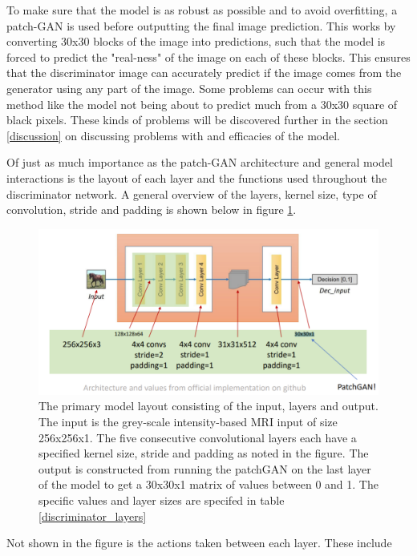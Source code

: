 \documentclass[12pt, fleqn, titlepage]{article}
\begin{document}
To make sure that the model is as robust as possible and to avoid overfitting, a patch-GAN is used before outputting the final image prediction. This works by converting 30x30 blocks of the image into predictions, such that the model is forced to predict the "real-ness" of the image on each of these blocks. This ensures that the discriminator image can accurately predict if the image comes from the generator using any part of the image. Some problems can occur with this method like the model not being about to predict much from a 30x30 square of black pixels. These kinds of problems will be discovered further in the section \ref{discussion} on discussing problems with and efficacies of the model.

Of just as much importance as the patch-GAN architecture and general model interactions is the layout of each layer and the functions used throughout the discriminator network. A general overview of the layers, kernel size, type of convolution, stride and padding is shown below in figure \ref{fig:cyclegandiscriminatorlayers}.
\begin{figure}[H]
	\centering
	\includegraphics[width=0.7\linewidth]{imgs/cyclegan_discriminator_layers}
	\caption{The primary model layout consisting of the input, layers and output. The input is the grey-scale intensity-based MRI input of size 256x256x1. The five consecutive convolutional layers each have a specified kernel size, stride and padding as noted in the figure. The output is constructed from running the patchGAN on the last layer of the model to get a 30x30x1 matrix of values between 0 and 1. The specific values and layer sizes are specifed in table \ref{discriminator_layers}}
	\label{fig:cyclegandiscriminatorlayers}
\end{figure}

Not shown in the figure is the actions taken between each layer. These include 
\end{document}
